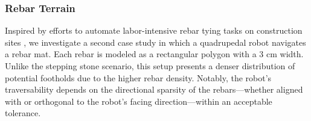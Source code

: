 \subsubsection{Rebar Terrain}
Inspired by efforts to automate labor-intensive rebar tying tasks on construction sites \citep{asselmeier2024hierarchical}, we investigate a second case study in which a quadrupedal robot navigates a rebar mat. Each rebar is modeled as a rectangular polygon with a 3 cm width. Unlike the stepping stone scenario, this setup presents a denser distribution of potential footholds due to the higher rebar density. Notably, the robot’s traversability depends on the directional sparsity of the rebars—whether aligned with or orthogonal to the robot’s facing direction—within an acceptable tolerance.

